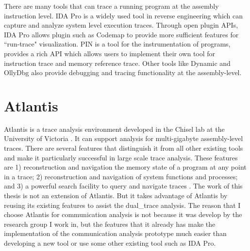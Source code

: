 There are many tools that can trace a running program at the assembly instruction level.  IDA Pro \cite{eagle_ida_2008} is a widely used tool in reverse engineering which can capture and analyze system level execution traces. Through open plugin APIs, IDA Pro allows plugin such as Codemap \cite{_c0demap/codemap:_????} to provide more sufficient features for ``run-trace" visualization. PIN \cite{_pin_????} is a tool for the instrumentation of programs, provides a rich API which allows users to implement their own tool for instruction trace and memory reference trace. Other tools like Dynamic \cite{brueningqz} and OllyDbg \cite{yuschuk2007ollydbg} also provide debugging and tracing functionality at the assembly-level. 

\section{Atlantis}
Atlantis is a trace analysis environment developed in the Chisel lab at the University of Victoria \cite{huang2017atlantis}. It can support analysis for multi-gigabyte assembly-level traces. There are several features that distinguish it from all other existing tools and make it particularly successful in large scale trace analysis. These features are 1) reconstruction and navigation the memory state of a program at any point in a trace; 2) reconstruction and navigation of system functions and processes; and 3) a powerful search facility to query and navigate traces \cite{huang2017atlantis}. The work of this thesis is not an extension of Atlantis. But it takes advantage of Atlantis by reusing its existing features to assist the dual\_trace analysis. The reason that I choose Atlantis for communication analysis is not because it was develop by the research group I work in, but the features that it already has make the implementation of the communication analysis prototype much easier than developing a new tool or use some other existing tool such as IDA Pro.




